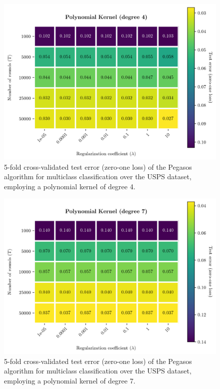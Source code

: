 \documentclass[runningheads]{llncs}
\begin{document}
\begin{figure}
  \center
  \includegraphics[width=0.8\linewidth]{../img/poly_4_error.png}
  \caption{5-fold cross-validated test error (zero-one loss) of the Pegasos algorithm for multiclass classification over the USPS dataset, employing a polynomial kernel of degree 4.} 
  \label{fig:experiments:polynomial_4}
\end{figure}

\begin{figure}
  \center
  \includegraphics[width=0.8\linewidth]{../img/poly_7_error.png}
  \caption{5-fold cross-validated test error (zero-one loss) of the Pegasos algorithm for multiclass classification over the USPS dataset, employing a polynomial kernel of degree 7.} 
  \label{fig:experiments:polynomial_7}
\end{figure}
\end{document}
